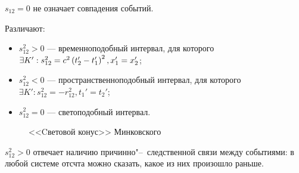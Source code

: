     \begin{note}
        $s_{12} = 0$ не означает совпадения событий.
    \end{note}

    Различают:
    \begin{itemize}
        \item $s_{12}^2 > 0$ --- временноподобный интервал, для которого $\exists K' : s_{12}^2 = c^2\left({t_2' - t_1'}\right)^2, x_1' = x_2'$;
        \item $s_{12}^2 < 0$ --- пространственноподобный интервал, для которого $\exists K' : s_{12}^2 = -r_{12}^2, t_1' = t_2'$;
        \item $s_{12}^2 = 0$ --- светоподобный интервал.
    \end{itemize}

    \begin{figure}[h]
        \centering
        
        \caption{<<Cветовой конус>> Минковского}
    \end{figure}
    \newpage
    $s_{12}^2 > 0$ отвечает наличию причинно"--~следственной связи между событиями: в любой системе отсчта можно сказать, какое из них произошло раньше.
